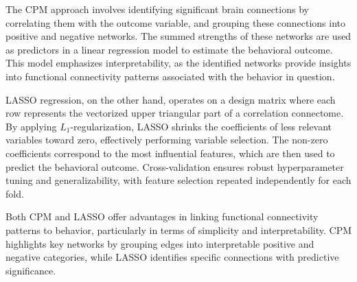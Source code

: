 \documentclass[10pt]{article}
\begin{document}
The CPM approach involves identifying significant brain connections by correlating them with the outcome variable, and grouping these connections into positive and negative networks. The summed strengths of these networks are used as predictors in a linear regression model to estimate the behavioral outcome. This model emphasizes interpretability, as the identified networks provide insights into functional connectivity patterns associated with the behavior in question.

LASSO regression, on the other hand, operates on a design matrix where each row represents the vectorized upper triangular part of a correlation connectome. By applying $L_1$-regularization, LASSO shrinks the coefficients of less relevant variables toward zero, effectively performing variable selection. The non-zero coefficients correspond to the most influential features, which are then used to predict the behavioral outcome. Cross-validation ensures robust hyperparameter tuning and generalizability, with feature selection repeated independently for each fold.

Both CPM and LASSO offer advantages in linking functional connectivity patterns to behavior, particularly in terms of simplicity and interpretability. CPM highlights key networks by grouping edges into interpretable positive and negative categories, while LASSO identifies specific connections with predictive significance. 
\end{document}
